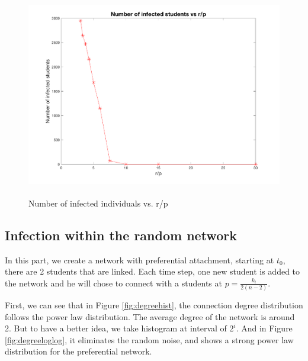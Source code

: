\documentclass[12pt]{article}
\begin{document}
\begin{figure}[H] %
\centering
\includegraphics[width = 12 cm, height = 9cm]{infectprp.png}
\caption{Number of infected individuals vs. r/p}
\label{fig:infectprp}
\end{figure}



\newpage
\subsection{Infection within the random network}

In this part, we create a network with preferential attachment, starting at $t_{0}$, there are 2 students that are linked. Each time step, one new student is added to the network and he will chose to connect with a students at $p = \frac{k_{i}}{2(n-2)}$. 

First, we can see that in Figure \ref{fig:degreehist}, the connection degree distribution follows the power law distribution. The average degree of the network is around 2. But to have a better idea, we take histogram at interval of $2^{i}$. And in Figure \ref{fig:degreeloglog}, it eliminates the random noise, and shows a strong power law distribution for the preferential network.
\end{document}
